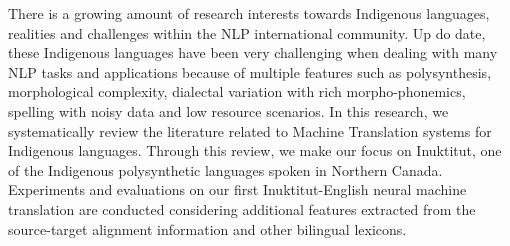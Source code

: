 There is a growing amount of research interests towards Indigenous languages, realities and challenges within the NLP international community. Up do date, these Indigenous languages have been very challenging when dealing with many NLP tasks and applications because of multiple features such as polysynthesis, morphological complexity, dialectal variation with rich morpho-phonemics, spelling with noisy data and low resource scenarios. In this research, we systematically review the literature related to Machine Translation systems for Indigenous languages. Through this review, we make our focus on Inuktitut, one of the Indigenous polysynthetic languages spoken in Northern Canada. Experiments and evaluations on our first Inuktitut-English neural machine translation are conducted considering additional features extracted from the source-target alignment information and other bilingual lexicons.
